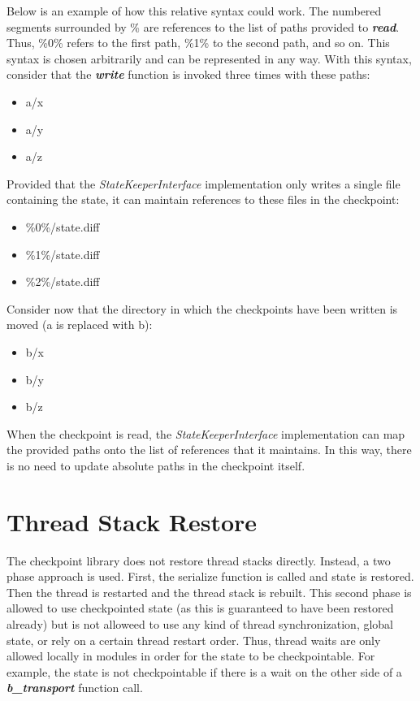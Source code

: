 \documentclass[oneside]{memoir}
\begin{document}
Below is an example of how this relative syntax could work.
The numbered segments surrounded by \% are references to the list of paths provided to \textit{\textbf{read}}.
Thus, \%0\% refers to the first path, \%1\% to the second path, and so on.
This syntax is chosen arbitrarily and can be represented in any way.
With this syntax, consider that the \textit{\textbf{write}} function is invoked three times with these paths:

\begin{itemize}
\item[] a/x
\item[] a/y
\item[] a/z
\end{itemize}

Provided that the \textit{StateKeeperInterface} implementation only writes a single file containing the state, it can maintain references to these files in the checkpoint:

\begin{itemize}
\item[] \%0\%/state.diff
\item[] \%1\%/state.diff
\item[] \%2\%/state.diff
\end{itemize}

Consider now that the directory in which the checkpoints have been written is moved (a is replaced with b):

\begin{itemize}
\item[] b/x
\item[] b/y
\item[] b/z
\end{itemize}

When the checkpoint is read, the \textit{StateKeeperInterface} implementation can map the provided paths onto the list of references that it maintains.
In this way, there is no need to update absolute paths in the checkpoint itself.

\chapter{Thread Stack Restore}
\label{thread-stack-restore}

The checkpoint library does not restore thread stacks directly.
Instead, a two phase approach is used.
First, the serialize function is called and state is restored.
Then the thread is restarted and the thread stack is rebuilt.
This second phase is allowed to use checkpointed state (as this is guaranteed to have been restored already) but is not alloweed to use any kind of thread synchronization, global state, or rely on a certain thread restart order.
Thus, thread waits are only allowed locally in modules in order for the state to be checkpointable.
For example, the state is not checkpointable if there is a wait on the other side of a \textit{\textbf{b\_transport}} function call.
\end{document}

